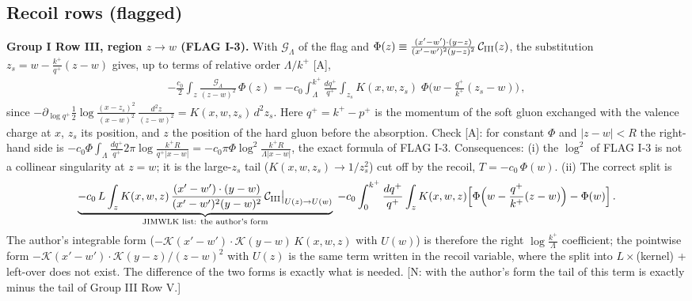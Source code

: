 \documentclass[9pt]{article}
\numberwithin{equation}{section}
\begin{document}
\subsection{Recoil rows (flagged)}
\noindent\textbf{Group I Row III, region $z\to w$ (FLAG I-3).} With $\mathcal{G}_{\Lambda}$ of the flag and $\Phi(z)\equiv\frac{(x'-w')\cdot(y-z)}{(x'-w')^{2}(y-z)^{2}}\,\mathcal{C}_{\rm III}(z)$, the substitution $z_{s}=w-\frac{k^{+}}{q^{+}}(z-w)$ gives, up to terms of relative order $\Lambda/k^{+}$ [A],
\begin{align}
-\frac{c_{0}}{2}\int_{z}\frac{\mathcal{G}_{\Lambda}}{(z-w)^{2}}\,\Phi(z)=-c_{0}\int_{\Lambda}^{k^{+}}\frac{dq^{+}}{q^{+}}\int_{z_{s}}K(x,w,z_{s})\;\Phi\Big(w-\frac{q^{+}}{k^{+}}(z_{s}-w)\Big)\,,
\end{align}
since $-\partial_{\log q^{+}}\frac{1}{2}\log\frac{(x-z_{s})^{2}}{(x-w)^{2}}\,\frac{d^{2}z}{(z-w)^{2}}=K(x,w,z_{s})\,d^{2}z_{s}$. Here $q^{+}=k^{+}-p^{+}$ is the momentum of the soft gluon exchanged with the valence charge at $x$, $z_{s}$ its position, and $z$ the position of the hard gluon before the absorption. Check [A]: for constant $\Phi$ and $|z-w|<R$ the right-hand side is $-c_{0}\Phi\int_{\Lambda}\frac{dq^{+}}{q^{+}}2\pi\log\frac{k^{+}R}{q^{+}|x-w|}=-c_{0}\pi\Phi\log^{2}\frac{k^{+}R}{\Lambda|x-w|}$, the exact formula of FLAG I-3. Consequences: (i) the $\log^{2}$ of FLAG I-3 is not a collinear singularity at $z=w$; it is the large-$z_{s}$ tail ($K(x,w,z_{s})\to1/z_{s}^{2}$) cut off by the recoil, $T=-c_{0}\,\Phi(w)$. (ii) The correct split is
\begin{align}
\underbrace{-c_{0}\,L\int_{z}K(x,w,z)\,\frac{(x'-w')\cdot(y-w)}{(x'-w')^{2}(y-w)^{2}}\,\mathcal{C}_{\rm III}\big|_{U(z)\to U(w)}}_{\text{JIMWLK list: the author's form}}\;-c_{0}\int_{0}^{k^{+}}\frac{dq^{+}}{q^{+}}\int_{z}K(x,w,z)\Big[\Phi\Big(w-\frac{q^{+}}{k^{+}}(z-w)\Big)-\Phi(w)\Big]\,.
\end{align}
The author's integrable form ($-\mathcal{K}(x'-w')\cdot\mathcal{K}(y-w)\,K(x,w,z)$ with $U(w)$) is therefore the right $\log\frac{k^{+}}{\Lambda}$ coefficient; the pointwise form $-\mathcal{K}(x'-w')\cdot\mathcal{K}(y-z)/(z-w)^{2}$ with $U(z)$ is the same term written in the recoil variable, where the split into $L\times$(kernel) + left-over does not exist. The difference of the two forms is exactly what is needed. [N: with the author's form the tail of this term is exactly minus the tail of Group III Row V.]
\end{document}
